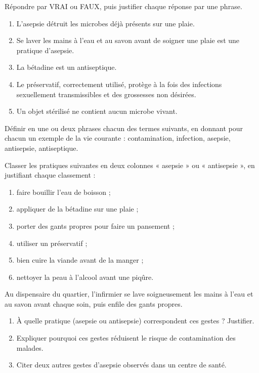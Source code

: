 \documentclass[11pt]{article}
\newcommand{\cle}[1]{{\popxbold\color{popdark}#1}}
\newcounter{popsec}
\newcounter{popsub}
\newcommand{\courssub}[1]{%
  \stepcounter{popsub}%
  \par\vspace{9pt}\noindent{\popxbold\fontsize{11.5}{13}\selectfont\color{popink}{\color{poporange}\thepopsec.\thepopsub}\hspace{6pt}#1}\par\nopagebreak\vspace{4pt}
}
\begin{document}
\begin{exercice}
Répondre par VRAI ou FAUX, puis justifier chaque réponse par une phrase.
\begin{enumerate}
\item L'asepsie détruit les microbes déjà présents sur une plaie.
\item Se laver les mains à l'eau et au savon avant de soigner une plaie est une pratique d'asepsie.
\item La bétadine est un antiseptique.
\item Le préservatif, correctement utilisé, protège à la fois des infections sexuellement transmissibles et des grossesses non désirées.
\item Un objet stérilisé ne contient aucun microbe vivant.
\end{enumerate}
\end{exercice}

\begin{exercice}[Définitions]
Définir en une ou deux phrases chacun des termes suivants, en donnant pour chacun un exemple de la vie courante : \cle{contamination}, \cle{infection}, \cle{asepsie}, \cle{antisepsie}, \cle{antiseptique}.
\end{exercice}

\begin{exercice}
Classer les pratiques suivantes en deux colonnes « asepsie » ou « antisepsie », en justifiant chaque classement :
\begin{enumerate}
\item faire bouillir l'eau de boisson ;
\item appliquer de la bétadine sur une plaie ;
\item porter des gants propres pour faire un pansement ;
\item utiliser un préservatif ;
\item bien cuire la viande avant de la manger ;
\item nettoyer la peau à l'alcool avant une piqûre.
\end{enumerate}
\end{exercice}

\courssub{Je m'entraîne}

\begin{exercice}
Au dispensaire du quartier, l'infirmier se lave soigneusement les mains à l'eau et au savon avant chaque soin, puis enfile des gants propres.
\begin{enumerate}
\item À quelle pratique (asepsie ou antisepsie) correspondent ces gestes ? Justifier.
\item Expliquer pourquoi ces gestes réduisent le risque de contamination des malades.
\item Citer deux autres gestes d'asepsie observés dans un centre de santé.
\end{enumerate}
\end{exercice}
\end{document}
